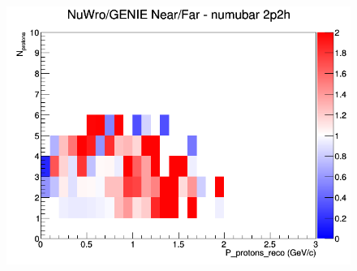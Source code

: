 \documentclass[12pt]{article}
\begin{document}
\begin{figure}[h]
\endminipage
{}
\includegraphics[width=\linewidth]{eff_N_P/LAr/protons/ratios/2p2h_NuWro_GENIE_numubar_NF_N_P.png}
\endminipage
\newline
\end{figure}
\clearpage
\end{document}
